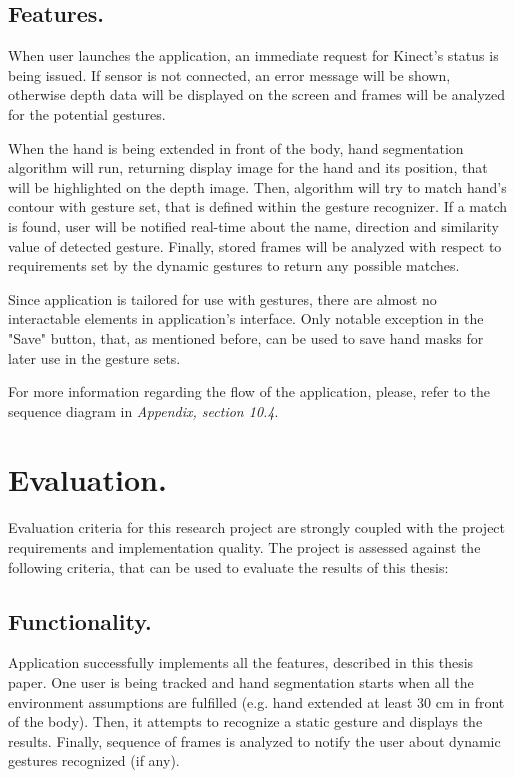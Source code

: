 \documentclass[a4paper,11pt,oneside]{article}
\begin{document}
\subsection{Features.}

When user launches the application, an immediate request for Kinect's status is being issued. If sensor is not connected, an error message will be shown, otherwise depth data will be displayed on the screen and frames will be analyzed for the potential gestures. 

When the hand is being extended in front of the body, hand segmentation algorithm will run, returning display image for the hand and its position, that will be highlighted on the depth image. Then, algorithm will try to match hand's contour with gesture set, that is defined within the gesture recognizer. If a match is found, user will be notified real-time about the name, direction and similarity value of detected gesture. Finally, stored frames will be analyzed with respect to requirements set by the dynamic gestures to return any possible matches.

Since application is tailored for use with gestures, there are almost no interactable elements in application's interface. Only notable exception in the "Save" button, that, as mentioned before, can be used to save hand masks for later use in the gesture sets.

For more information regarding the flow of the application, please, refer to the sequence diagram in \textit{Appendix, section 10.4}.

\section{Evaluation.}

Evaluation criteria for this research project are strongly coupled with the project requirements and implementation quality. The project is assessed against the following criteria, that can be used to evaluate the results of this thesis:

\subsection{Functionality.}
Application successfully implements all the features, described in this thesis paper. One user is being tracked and hand segmentation starts when all the environment assumptions are fulfilled (e.g. hand extended at least 30 cm in front of the body). Then, it attempts to recognize a static gesture and displays the results. Finally, sequence of frames is analyzed to notify the user about dynamic gestures recognized (if any).
\end{document}
